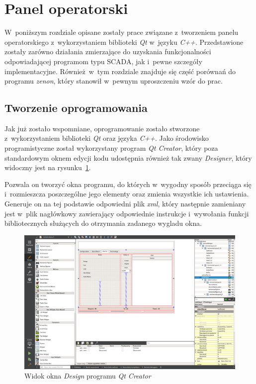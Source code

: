 \section{Panel operatorski}
\indent

W~poniższym rozdziale opisane zostały prace związane z~tworzeniem panelu
operatorskiego z~wykorzystaniem biblioteki \textit{Qt} w~języku \textit{C++}.
Przedstawione zostały zarówno działania zmierzające do uzyskania funkcjonalności
odpowiadającej programom typu SCADA, jak i~pewne szczegóły implementacyjne.
Również w~tym rozdziale znajduje się część porównań do programu \textit{zenon},
który stanowił w~pewnym uproszczeniu wzór do prac.

\subsection{Tworzenie oprogramowania}
\indent

Jak już zostało wspomniane, oprogramowanie zostało stworzone z~wykorzystaniem
biblioteki \textit{Qt} oraz języka \textit{C++}. Jako środowisko programistyczne
został wykorzystany program \textit{Qt Creator}, który poza standardowym oknem
edycji kodu udostępnia również tak zwany \textit{Designer}, który widoczny jest
na rysunku~\ref{fig:qtcreator}.

Pozwala on tworzyć okna programu, do których w~wygodny sposób przeciąga się
i~rozmieszcza poszczególne jego elementy oraz zmienia wszystkie ich ustawienia.
Generuje on na tej podstawie odpowiedni plik \textit{xml}, który następnie
zamieniany jest w~plik nagłówkowy zawierający odpowiednie instrukcje i~wywołania
funkcji bibliotecznych służących do otrzymania zadanego wygladu okna.

\begin{figure}[!ht]
    \centering
    \includegraphics[width=\textwidth]{../img/qtcreator.png}
    \caption{Widok okna \textit{Design} programu \textit{Qt Creator}}
    \label{fig:qtcreator}
\end{figure}


